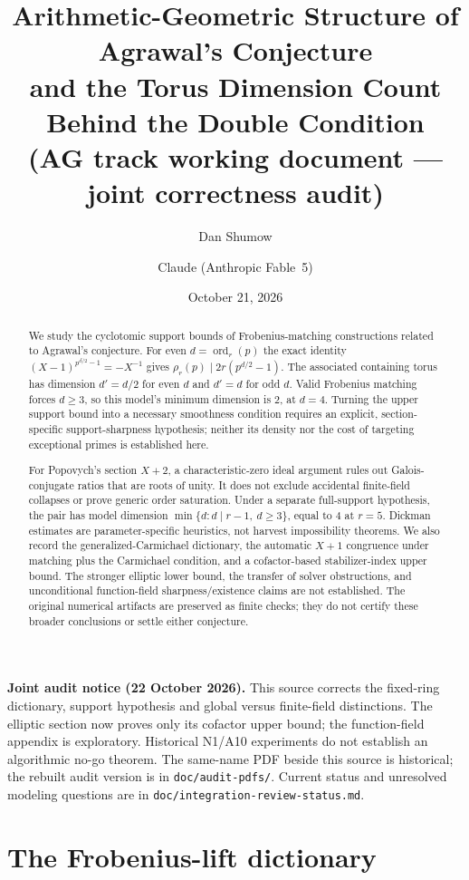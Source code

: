 \documentclass[11pt]{article}
\title{Arithmetic-Geometric Structure of Agrawal's Conjecture\\
and the Torus Dimension Count Behind the Double Condition\\
\large (AG track working document --- joint correctness audit)}
\author{Dan Shumow \and Claude (Anthropic Fable~5)}
\date{October 21, 2026}
\theoremstyle{remark}
\DeclareMathOperator{\ord}{ord}
\begin{document}
\maketitle

\noindent\textbf{Joint audit notice (22 October 2026).}
This source corrects the fixed-ring dictionary, support hypothesis and global
versus finite-field distinctions. The elliptic section now proves only its
cofactor upper bound; the function-field appendix is exploratory. Historical
N1/A10 experiments do not establish an algorithmic no-go theorem. The
same-name PDF beside this source is historical; the rebuilt audit version is
in \texttt{doc/audit-pdfs/}. Current status and unresolved modeling questions
are in \texttt{doc/integration-review-status.md}.

\begin{abstract}
We study the cyclotomic support bounds of Frobenius-matching constructions
related to Agrawal's conjecture. For even $d=\ord_r(p)$ the exact identity
$(X-1)^{p^{d/2}-1}=-X^{-1}$ gives
$\rho_r(p)\mid2r(p^{d/2}-1)$. The associated containing torus has dimension
$d'=d/2$ for even $d$ and $d'=d$ for odd $d$. Valid Frobenius matching forces
$d\ge3$, so this model's minimum dimension is $2$, at $d=4$.
Turning the upper support bound into a necessary smoothness condition
requires an explicit, section-specific support-sharpness hypothesis; neither
its density nor the cost of targeting exceptional primes is established here.

For Popovych's section $X+2$, a characteristic-zero ideal argument rules out
Galois-conjugate ratios that are roots of unity. It does not exclude accidental
finite-field collapses or prove generic order saturation. Under a separate
full-support hypothesis, the pair has model dimension
$\min\{d:d\mid r-1,\ d\ge3\}$, equal to $4$ at $r=5$. Dickman estimates are
parameter-specific heuristics, not harvest impossibility theorems.
We also record the generalized-Carmichael dictionary, the automatic $X+1$
congruence under matching plus the Carmichael condition, and a cofactor-based
stabilizer-index upper bound. The stronger elliptic lower bound, the transfer
of solver obstructions, and unconditional function-field sharpness/existence
claims are not established. The original numerical artifacts are preserved as
finite checks; they do not certify these broader conclusions or settle either
conjecture.
\end{abstract}

\section{The Frobenius-lift dictionary}\label{sec:dictionary}
\end{document}
